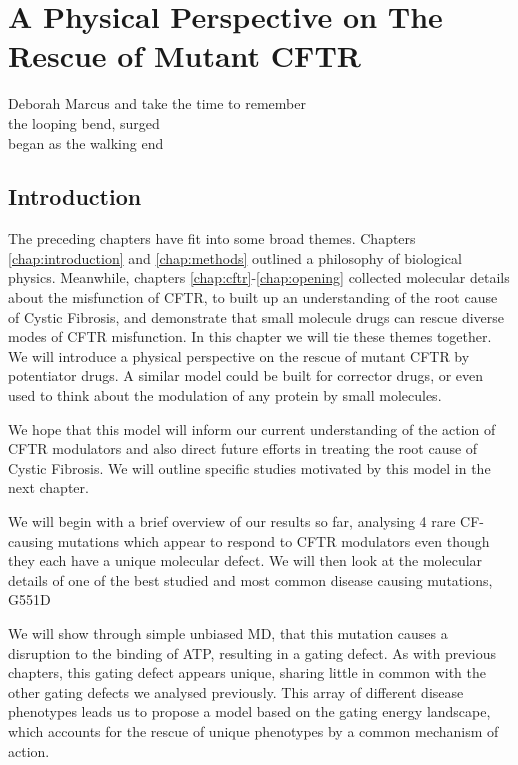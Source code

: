 \chapter{A Physical Perspective on The Rescue of Mutant CFTR}
\label{chap:perspective}

\begin{chapquote}{Deborah Marcus \cite{marcus_ouroboros}}
and take the time to remember\\
the looping bend, surged\\
began as the walking end
\end{chapquote}

\section{Introduction}

The preceding chapters have fit into some broad themes. Chapters \ref{chap:introduction} and \ref{chap:methods} outlined a philosophy of biological physics. Meanwhile, chapters \ref{chap:cftr}-\ref{chap:opening} collected molecular details about the misfunction of CFTR, to built up an understanding of the root cause of Cystic Fibrosis, and demonstrate that small molecule drugs can rescue diverse modes of CFTR misfunction. In this chapter we will tie these themes together. We will introduce a physical perspective on the rescue of mutant CFTR by potentiator drugs. A similar model could be built for corrector drugs, or even used to think about the modulation of any protein by small molecules.

We hope that this model will inform our current understanding of the action of CFTR modulators and also direct future efforts in treating the root cause of Cystic Fibrosis. We will outline specific studies motivated by this model in the next chapter.

We will begin with a brief overview of our results so far, analysing 4 rare CF-causing mutations which appear to respond to CFTR modulators even though they each have a unique molecular defect. We will then look at the molecular details of one of the best studied and most common disease causing mutations, G551D


We will show through simple unbiased MD, that this mutation causes a disruption to the binding of ATP, resulting in a gating defect. As with previous chapters, this gating defect appears unique, sharing little in common with the other gating defects we analysed previously. This array of different disease phenotypes leads us to propose a model based on the gating energy landscape, which accounts for the rescue of unique phenotypes by a common mechanism of action. 

